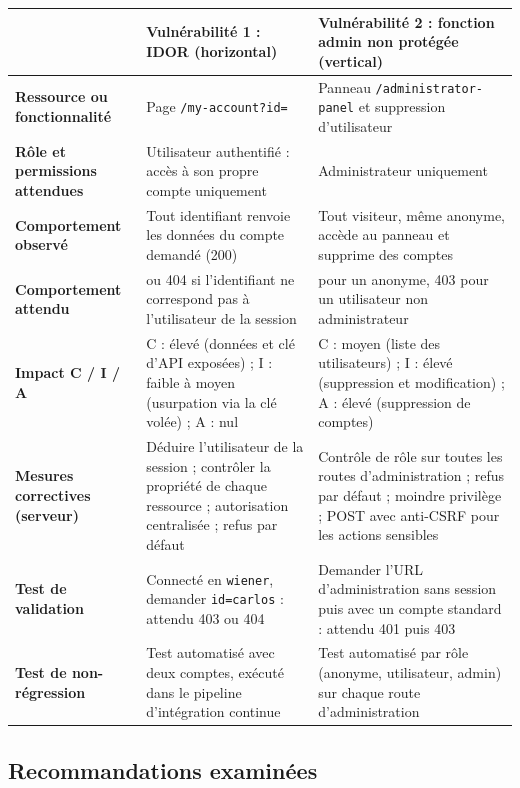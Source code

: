 \documentclass{rapportENSIAS}
\begin{document}
\renewcommand{\arraystretch}{1.3}
\begin{center}
\begin{tabular}{|>{\raggedright\arraybackslash}p{2.6cm}|>{\raggedright\arraybackslash}p{6cm}|>{\raggedright\arraybackslash}p{6cm}|}
\hline
 & \textbf{Vulnérabilité 1 : IDOR (horizontal)} & \textbf{Vulnérabilité 2 : fonction admin non protégée (vertical)} \\
\hline
\textbf{Ressource ou fonctionnalité} & Page \texttt{/my-account?id=} & Panneau \texttt{/administrator-panel} et suppression d'utilisateur \\
\hline
\textbf{Rôle et permissions attendues} & Utilisateur authentifié : accès à son propre compte uniquement & Administrateur uniquement \\
\hline
\textbf{Comportement observé} & Tout identifiant renvoie les données du compte demandé (200) & Tout visiteur, même anonyme, accède au panneau et supprime des comptes \\
\hline
\textbf{Comportement attendu} & 403 ou 404 si l'identifiant ne correspond pas à l'utilisateur de la session & 401 pour un anonyme, 403 pour un utilisateur non administrateur \\
\hline
\textbf{Impact C / I / A} & C : élevé (données et clé d'API exposées) ; I : faible à moyen (usurpation via la clé volée) ; A : nul & C : moyen (liste des utilisateurs) ; I : élevé (suppression et modification) ; A : élevé (suppression de comptes) \\
\hline
\textbf{Mesures correctives (serveur)} & Déduire l'utilisateur de la session ; contrôler la propriété de chaque ressource ; autorisation centralisée ; refus par défaut & Contrôle de rôle sur toutes les routes d'administration ; refus par défaut ; moindre privilège ; POST avec anti-CSRF pour les actions sensibles \\
\hline
\textbf{Test de validation} & Connecté en \texttt{wiener}, demander \texttt{id=carlos} : attendu 403 ou 404 & Demander l'URL d'administration sans session puis avec un compte standard : attendu 401 puis 403 \\
\hline
\textbf{Test de non-régression} & Test automatisé avec deux comptes, exécuté dans le pipeline d'intégration continue & Test automatisé par rôle (anonyme, utilisateur, admin) sur chaque route d'administration \\
\hline
\end{tabular}
\end{center}

\subsection*{Recommandations examinées}
\end{document}

